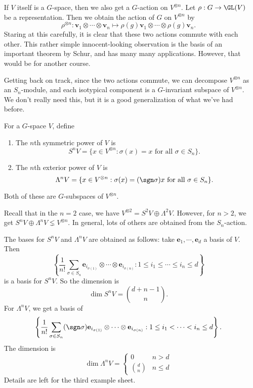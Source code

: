 \documentclass[a4paper]{article}
\begin{document}
If $V$ itself is a $G$-space, then we also get a $G$-action on $V^{\otimes n}$. Let $\rho: G \to \GL(V)$ be a representation. Then we obtain the action of $G$ on $V^{\otimes n}$ by
\[
  \rho^{\otimes n}: \mathbf{v}_1 \otimes \cdots \otimes \mathbf{v}_n \mapsto \rho(g) \mathbf{v}_1 \otimes \cdots \otimes \rho(g) \mathbf{v}_n.
\]
Staring at this carefully, it is clear that these two actions commute with each other. This rather simple innocent-looking observation is the basis of an important theorem by Schur, and has many many applications. However, that would be for another course.

Getting back on track, since the two actions commute, we can decompose $V^{\otimes n}$ as an $S_n$-module, and each isotypical component is a $G$-invariant subspace of $V^{\otimes n}$. We don't really need this, but it is a good generalization of what we've had before.

\begin{defi} 
  For a $G$-space $V$, define
  \begin{enumerate}
    \item The $n$th symmetric power of $V$ is
      \[
        S^n V = \{x \in V^{\otimes n}: \sigma(x) = x\text{ for all }\sigma \in S_n\}.
      \]
    \item The $n$th exterior power of $V$ is
      \[
        \Lambda^n V = \{x \in V^{\otimes n}: \sigma(x) = (\sgn \sigma) x \text{ for all }\sigma \in S_n\}.
      \]
  \end{enumerate}
  Both of these are $G$-subspaces of $V^{\otimes n}$.
\end{defi}
Recall that in the $n = 2$ case, we have $V^{\otimes 2} = S^2 V \oplus \Lambda^2 V$. However, for $n > 2$, we get $S^n V \oplus \Lambda^n V \lneq V^{\otimes n}$. In general, lots of others are obtained from the $S_n$-action.

\begin{eg}
  The bases for $S^n V$ and $\Lambda^n V$ are obtained as follows: take $\mathbf{e}_1, \cdots, \mathbf{e}_d$ a basis of $V$. Then
  \[
    \left\{\frac{1}{n!}\sum_{\sigma \in S_n} \mathbf{e}_{i_{\sigma(1)}}\otimes \cdots \otimes \mathbf{e}_{i_{\sigma(n)}} : 1 \leq i_1 \leq \cdots \leq i_n \leq d\right\}
  \]
  is a basis for $S^n V$. So the dimension is
  \[
    \dim S^n V = \binom{d + n - 1}{n}.
  \]
  For $\Lambda^n V$, we get a basis of
  \[
    \left\{\frac{1}{n!} \sum_{\sigma \in S_n} (\sgn \sigma) \mathbf{e}_{i_{\sigma(1)}} \otimes \cdots \otimes \mathbf{e}_{i_{\sigma(n)}}: 1 \leq i_1 < \cdots < i_n \leq d\right\}.
  \]
  The dimension is
  \[
    \dim \Lambda^n V =
    \begin{cases}
      0 & n > d\\
      \binom{d}{n} & n \leq d
    \end{cases}
  \]
  Details are left for the third example sheet.
\end{eg}
\end{document}
